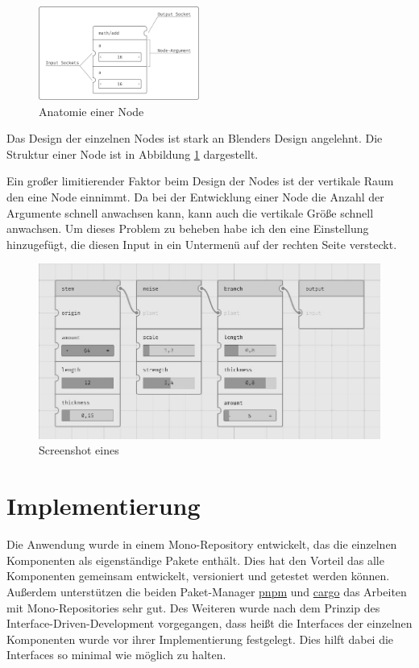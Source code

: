 \documentclass[ngerman]{article}
\begin{document}
\begingroup
\setlength\intextsep{4pt}
\begin{minipage}{\linewidth}
\begin{figure}
    \includegraphics[width=0.47\textwidth]{graphics/NODE_ANATOMY.pdf}
    \caption{Anatomie einer Node}
    \label{sec:NODE_ANATOMY}
\end{figure}

Das Design der einzelnen Nodes ist stark an Blenders Design angelehnt. Die Struktur einer Node ist in Abbildung \ref{sec:NODE_ANATOMY} dargestellt. 

Ein großer limitierender Faktor beim Design der Nodes ist der vertikale Raum den eine Node einnimmt. Da bei der Entwicklung einer Node die Anzahl der Argumente schnell anwachsen kann, kann auch die vertikale Größe schnell anwachsen. 
Um dieses Problem zu beheben habe ich den  eine Einstellung hinzugefügt, die diesen Input in ein Untermenü auf der rechten Seite versteckt. 
\end{minipage}
\br
\endgroup

\begin{figure}[htpb]
  \centering
  \includegraphics[width=1\textwidth]{graphics/node_graph.jpg}
  \caption{Screenshot eines }
  \label{fig:node_graph_screenshot}
\end{figure}


\section{Implementierung}
Die Anwendung wurde in einem Mono-Repository entwickelt, das die einzelnen Komponenten als eigenständige Pakete enthält. Dies hat den Vorteil das alle Komponenten gemeinsam entwickelt, versioniert und getestet werden können. 
\br
Außerdem unterstützen die beiden Paket-Manager \href{https://pnpm.io/}{pnpm} und \href{https://crates.io/}{cargo} das Arbeiten mit 
Mono-Repositories sehr gut. 
\br
Des Weiteren wurde nach dem Prinzip des Interface-Driven-Development vorgegangen, dass heißt die Interfaces der einzelnen Komponenten wurde vor ihrer Implementierung festgelegt. Dies hilft dabei die Interfaces so minimal wie möglich zu halten.
\end{document}
